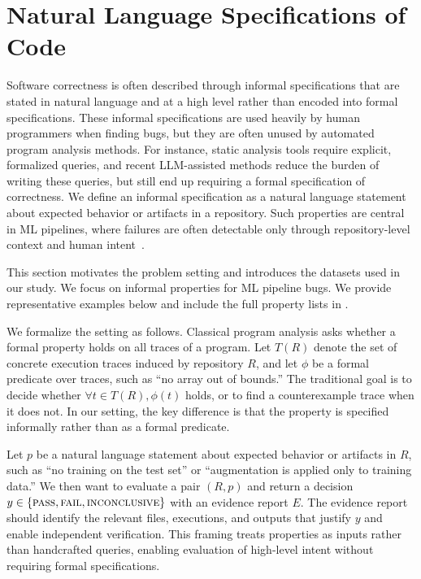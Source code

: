 \documentclass[11pt]{article}
\begin{document}
\section{Natural Language Specifications of Code}

Software correctness is often described through informal specifications that are stated in natural language and at a high level rather than encoded into formal specifications.
These informal specifications are used heavily by human programmers when finding bugs, but they are often unused by automated program analysis methods.
For instance, static analysis tools require explicit, formalized queries, and recent LLM-assisted methods reduce the burden of writing these queries, but still end up requiring a formal specification of correctness.
We define an informal specification as a natural language statement about expected behavior or artifacts in a repository.
Such properties are central in ML pipelines, where failures are often detectable only through repository-level context and human intent~\citep{schoop2021umlaut}.

This section motivates the problem setting and introduces the datasets used in our study.
We focus on informal properties for ML pipeline bugs.
We provide representative examples below and include the full property lists in .

We formalize the setting as follows.
Classical program analysis asks whether a formal property holds on all traces of a program.
Let $T(R)$ denote the set of concrete execution traces induced by repository $R$, and let $\phi$ be a formal predicate over traces, such as ``no array out of bounds.''
The traditional goal is to decide whether $\forall t \in T(R), \phi(t)$ holds, or to find a counterexample trace when it does not.
In our setting, the key difference is that the property is specified informally rather than as a formal predicate.

Let $p$ be a natural language statement about expected behavior or artifacts in $R$, such as ``no training on the test set'' or ``augmentation is applied only to training data.''
We then want to evaluate a pair $(R, p)$ and return a decision $y \in \{\textsc{pass}, \textsc{fail}, \textsc{inconclusive}\}$ with an evidence report $E$.
The evidence report should identify the relevant files, executions, and outputs that justify $y$ and enable independent verification.
This framing treats properties as inputs rather than handcrafted queries, enabling evaluation of high-level intent without requiring formal specifications.
\end{document}
